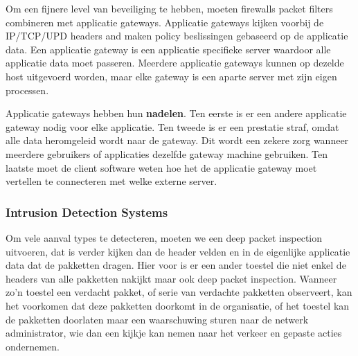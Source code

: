 
Om een fijnere level van beveiliging te hebben, moeten firewalls packet filters combineren met applicatie gateways. Applicatie gateways kijken voorbij de IP/TCP/UPD headers and maken policy beslissingen gebaseerd op de applicatie data. Een applicatie gateway is een applicatie specifieke server waardoor alle applicatie data moet passeren. Meerdere applicatie gateways kunnen op dezelde host uitgevoerd worden, maar elke gateway is een aparte server met zijn eigen processen.

Applicatie gateways hebben hun \textbf{nadelen}. Ten eerste is er een andere applicatie gateway nodig voor elke applicatie. Ten tweede is er een prestatie straf, omdat alle data heromgeleid wordt naar de gateway. Dit wordt een zekere zorg wanneer meerdere gebruikers of applicaties dezelfde gateway machine gebruiken. Ten laatste moet de client software weten hoe het de applicatie gateway moet vertellen te connecteren met welke externe server.

\subsubsection{Intrusion Detection Systems}

Om vele aanval types te detecteren, moeten we een deep packet inspection uitvoeren, dat is verder kijken dan de header velden en in de eigenlijke applicatie data dat de pakketten dragen.
Hier voor is er een ander toestel die niet enkel de headers van alle pakketten nakijkt maar ook deep packet inspection. Wanneer zo’n toestel een verdacht pakket, of serie van verdachte pakketten observeert, kan het voorkomen dat deze pakketten doorkomt in de organisatie, of het toestel kan de pakketten doorlaten maar een waarschuwing sturen naar de netwerk administrator, wie dan een kijkje kan nemen naar het verkeer en gepaste acties ondernemen.\\

